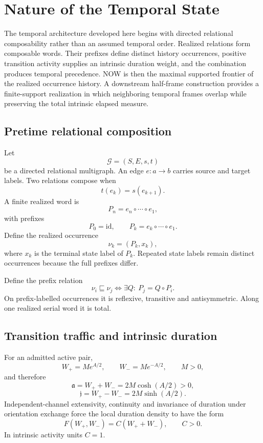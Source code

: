 
\chapter{Nature of the Temporal State}

The temporal architecture developed here begins with directed relational composability rather than an assumed temporal order. Realized relations form composable words. Their prefixes define distinct history occurrences, positive transition activity supplies an intrinsic duration weight, and the combination produces temporal precedence. NOW is then the maximal supported frontier of the realized occurrence history. A downstream half-frame construction provides a finite-support realization in which neighboring temporal frames overlap while preserving the total intrinsic elapsed measure.

\section{Pretime relational composition}

Let
\[
\mathcal G=(S,E,s,t)
\]
be a directed relational multigraph. An edge $e:a\to b$ carries source and target labels. Two relations compose when
\[
\boxed{t(e_k)=s(e_{k+1}).}
\]
A finite realized word is
\[
\boxed{
P_n=e_n\circ\cdots\circ e_1,
}
\]
with prefixes
\[
P_0=\mathrm{id},
\qquad
P_k=e_k\circ\cdots\circ e_1.
\]
Define the realized occurrence
\[
\boxed{\nu_k=(P_k,x_k),}
\]
where $x_k$ is the terminal state label of $P_k$. Repeated state labels remain distinct occurrences because the full prefixes differ.

Define the prefix relation
\[
\boxed{
\nu_i\sqsubseteq\nu_j
\iff
\exists Q:\ P_j=Q\circ P_i.
}
\]
On prefix-labelled occurrences it is reflexive, transitive and antisymmetric. Along one realized serial word it is total.

\section{Transition traffic and intrinsic duration}

For an admitted active pair,
\[
W_+=Me^{A/2},
\qquad
W_-=Me^{-A/2},
\qquad M>0,
\]
and therefore
\[
\boxed{\mathfrak a=W_++W_-=2M\cosh(A/2)>0,}
\]
\[
\boxed{\mathfrak j=W_+-W_-=2M\sinh(A/2).}
\]
Independent-channel extensivity, continuity and invariance of duration under orientation exchange force the local duration density to have the form
\[
F(W_+,W_-)=C(W_++W_-),
\qquad C>0.
\]
In intrinsic activity units $C=1$.

